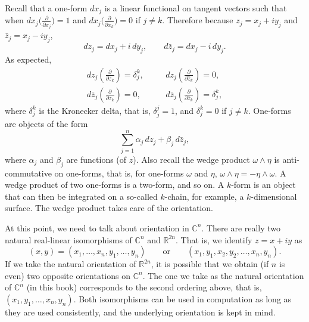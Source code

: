 \documentclass[12pt,openany]{book}
\newcommand{\C}{{\mathbb{C}}}
\newcommand{\R}{{\mathbb{R}}}
\theoremstyle{plain}
\theoremstyle{remark}
\theoremstyle{definition}
\theoremstyle{exercise}
\theoremstyle{example}
\begin{document}
Recall that a one-form $d x_j$ is a linear functional on tangent vectors
such that when $d x_j \bigl( \frac{\partial}{\partial x_j} \bigr) = 1$ and
$d x_j \bigl( \frac{\partial}{\partial x_k} \bigr) = 0$ if $j \not= k$.  Therefore because
$z_j = x_j + i y_j$ and
$\bar{z}_j = x_j - i y_j$,
\begin{equation*}
d z_j = d x_j + i \, d y_j , 
\qquad
d \bar{z}_j = d x_j - i \, d y_j . 
\end{equation*}
As expected,
\begin{equation*}
\begin{array}{lll}
d z_j \left( \frac{\partial}{\partial z_k} \right) = \delta_j^k ,
& \quad &
d z_j \left( \frac{\partial}{\partial \bar{z}_k} \right) = 0 , \\
d \bar{z}_j \left( \frac{\partial}{\partial z_k} \right) = 0 ,
& \quad &
d \bar{z}_j \left( \frac{\partial}{\partial \bar{z}_k} \right) = \delta_j^k
,
\end{array}
\end{equation*}
where $\delta_{j}^k$ is the Kronecker delta, that is, $\delta_j^j = 1$,
and $\delta_j^k = 0$ if $j \not= k$.  One-forms are objects of the form
\begin{equation*}
\sum_{j=1}^n \alpha_j \, d z_j + 
\beta_j \, d \bar{z}_j ,
\end{equation*}
where $\alpha_j$ and $\beta_j$ are functions (of $z$).
Also recall the wedge product $\omega \wedge \eta$ is anti-commutative on
one-forms,
that is, for one-forms $\omega$ and $\eta$,
$\omega \wedge \eta = - \eta \wedge \omega$.  A wedge product of two
one-forms is a two-form, and so on.  A $k$-form is an object that 
can then be integrated on a so-called $k$-chain, for example, a
$k$-dimensional surface.  The wedge product takes care of the orientation.

At this point, we need to talk about orientation in $\C^n$.  There are really two
natural real-linear isomorphisms of $\C^n$ and $\R^{2n}$.  That is, we
identify $z = x+iy$ as
\begin{equation*}
(x,y) = (x_1,\ldots,x_n,y_1,\ldots,y_n) \qquad
\text{or} \qquad
(x_1,y_1,x_2,y_2,\ldots,x_n,y_n) .
\end{equation*}
If we take the natural orientation of $\R^{2n}$,
it is possible that we obtain (if $n$ is even)
two opposite orientations on $\C^n$.
The one we take as the natural orientation of $\C^n$ (in this book)
corresponds to
the second ordering above, that
is, $(x_1,y_1,\ldots,x_n,y_n)$.  Both isomorphisms can be used
in computation as long as they are used consistently, and the underlying
orientation is kept in mind.
\end{document}
